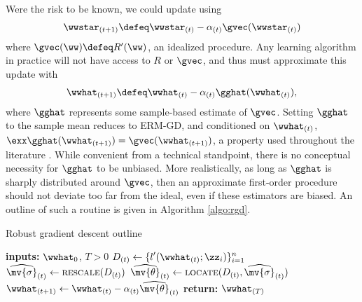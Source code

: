 \documentclass[11pt,oneside]{article}
\theoremstyle{definition} \newtheorem{defn}{Definition}       %
\theoremstyle{plain} \newtheorem{prop}[defn]{Proposition}           %
\theoremstyle{plain} \newtheorem{thm}[defn]{Theorem}                %
\theoremstyle{plain} \newtheorem{lem}[defn]{Lemma}                  %
\theoremstyle{plain} \newtheorem{cor}[defn]{Corollary}              %
\theoremstyle{remark} \newtheorem{rmk}[defn]{Remark}                %
\theoremstyle{remark} \newtheorem{ex}[defn]{Example}                %
\begin{document}
Were the risk to be known, we could update using
%
\begin{align}\label{eqn:GD_update_true}
\wwstar_{(t+1)} \defeq \wwstar_{(t)} - \alpha_{(t)} \gvec(\wwstar_{(t)})
\end{align}
%
where $\gvec(\ww) \defeq R^{\prime}(\ww)$, an idealized procedure. Any learning algorithm in practice will not have access to $R$ or $\gvec$, and thus must approximate this update with
%
\begin{align}\label{eqn:GD_update_approx}
\wwhat_{(t+1)} \defeq \wwhat_{(t)} - \alpha_{(t)} \gghat(\wwhat_{(t)}),
\end{align}
%
where $\gghat$ represents some sample-based estimate of $\gvec$. Setting $\gghat$ to the sample mean reduces to ERM-GD, and conditioned on $\wwhat_{(t)}$, $\exx \gghat(\wwhat_{(t+1)}) = \gvec(\wwhat_{(t+1)})$, a property used throughout the literature \citep{rakhlin2012a,leroux2012a,johnson2013a,shalev2013a,frostig2015a,murata2016a}. While convenient from a technical standpoint, there is no conceptual necessity for $\gghat$ to be unbiased. More realistically, as long as $\gghat$ is sharply distributed around $\gvec$, then an approximate first-order procedure should not deviate too far from the ideal, even if these estimators are biased. An outline of such a routine is given in Algorithm \ref{algo:rgd}.


\begin{algorithm}
\caption{Robust gradient descent outline}
\label{algo:rgd}
\begin{algorithmic}
\State \textbf{inputs:} $\wwhat_{0}$, $T>0$
  \State $\displaystyle D_{(t)} \gets \{l^{\prime}(\wwhat_{(t)};\zz_{i})\}_{i=1}^{n}$ \State{}
  \State $\displaystyle \widehat{\mv{\sigma}}_{(t)} \gets \text{\textsc{rescale}}(D_{(t)})$  \hfill{}
  \State $\displaystyle \widehat{\mv{\theta}}_{(t)} \gets \text{\textsc{locate}}(D_{(t)},\widehat{\mv{\sigma}}_{(t)})$  \hfill{}
  \State $\displaystyle \wwhat_{(t+1)} \gets \wwhat_{(t)} - \alpha_{(t)}\widehat{\mv{\theta}}_{(t)}$ \hfill{}
\EndFor
\State \textbf{return:} $\wwhat_{(T)}$
\end{algorithmic}
\end{algorithm}
\end{document}
